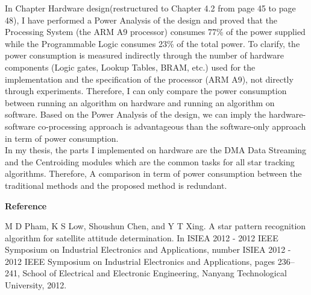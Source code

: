 \documentclass[dvips,a4paper,12pt]{report}
\begin{document}
\begin{enumerate}
    \color{black}
    In Chapter Hardware design(restructured to Chapter 4.2 from page 45 to page 48), I have performed a Power Analysis of the design and proved that the Processing System (the ARM A9 processor) consumes 77\% of the power supplied while the Programmable Logic consumes 23\% of the total power. To clarify, the power consumption is measured indirectly through the number of hardware components (Logic gates, Lookup Tables, BRAM, etc.) used for the implementation and the specification of the processor (ARM A9), not directly through experiments. Therefore, I can only compare the power consumption between running an algorithm on hardware and running an algorithm on software. Based on the Power Analysis of the design, we can imply the hardware-software co-processing approach is advantageous than the software-only approach in term of power consumption. \\
    In my thesis, the parts I implemented on hardware are the DMA Data Streaming and the Centroiding modules which are the common tasks for all star tracking algorithms. Therefore, A comparison in term of power consumption between the traditional methods and the proposed method is redundant.

\end{enumerate}

\color{black}
\noindent \large{\textbf{Reference}}

\noindent[1] M D Pham, K S Low, Shoushun Chen, and Y T Xing. A star pattern recognition algorithm for satellite attitude determination. In ISIEA 2012 - 2012 IEEE Symposium on Industrial Electronics and Applications, number ISIEA 2012 - 2012 IEEE Symposium on Industrial Electronics and Applications, pages 236–241, School of Electrical and Electronic Engineering, Nanyang Technological University, 2012.


\end{document}
